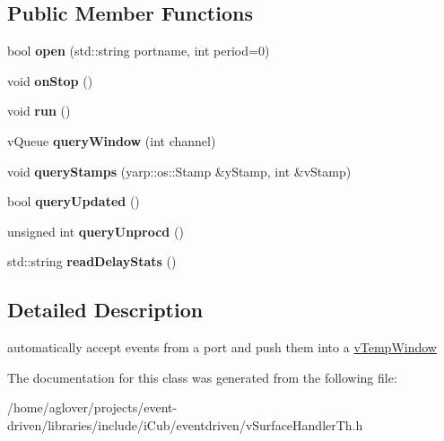 \subsection*{Public Member Functions}
\begin{DoxyCompactItemize}
\item 
bool {\bfseries open} (std\+::string portname, int period=0)\hypertarget{classev_1_1tWinThread_a1edd593d8901ca970a51bfeb09181234}{}\label{classev_1_1tWinThread_a1edd593d8901ca970a51bfeb09181234}

\item 
void {\bfseries on\+Stop} ()\hypertarget{classev_1_1tWinThread_ab12b04cd804ac7f6d2f6a199bb2078a8}{}\label{classev_1_1tWinThread_ab12b04cd804ac7f6d2f6a199bb2078a8}

\item 
void {\bfseries run} ()\hypertarget{classev_1_1tWinThread_a6992dcf7884d08d7296e4489ef264959}{}\label{classev_1_1tWinThread_a6992dcf7884d08d7296e4489ef264959}

\item 
v\+Queue {\bfseries query\+Window} (int channel)\hypertarget{classev_1_1tWinThread_a6937e3d587982b4ecbc8e776c89b5ea1}{}\label{classev_1_1tWinThread_a6937e3d587982b4ecbc8e776c89b5ea1}

\item 
void {\bfseries query\+Stamps} (yarp\+::os\+::\+Stamp \&y\+Stamp, int \&v\+Stamp)\hypertarget{classev_1_1tWinThread_a346e943bc1a1e06210deb6da26fa18f6}{}\label{classev_1_1tWinThread_a346e943bc1a1e06210deb6da26fa18f6}

\item 
bool {\bfseries query\+Updated} ()\hypertarget{classev_1_1tWinThread_a4121006bf6750fb8b5d2e2844479b39f}{}\label{classev_1_1tWinThread_a4121006bf6750fb8b5d2e2844479b39f}

\item 
unsigned int {\bfseries query\+Unprocd} ()\hypertarget{classev_1_1tWinThread_ab3f171e6997f7e7e68abf536afa97c17}{}\label{classev_1_1tWinThread_ab3f171e6997f7e7e68abf536afa97c17}

\item 
std\+::string {\bfseries read\+Delay\+Stats} ()\hypertarget{classev_1_1tWinThread_acb5f610d1fe4e6eef43cae31c0ea0f8e}{}\label{classev_1_1tWinThread_acb5f610d1fe4e6eef43cae31c0ea0f8e}

\end{DoxyCompactItemize}


\subsection{Detailed Description}
automatically accept events from a port and push them into a \hyperlink{classev_1_1vTempWindow}{v\+Temp\+Window} 

The documentation for this class was generated from the following file\+:\begin{DoxyCompactItemize}
\item 
/home/aglover/projects/event-\/driven/libraries/include/i\+Cub/eventdriven/v\+Surface\+Handler\+Th.\+h\end{DoxyCompactItemize}
